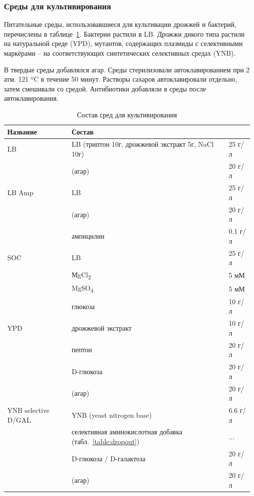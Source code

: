 \subsubsection{Среды для культивирования}
Питательные среды, использовавшиеся для культивации дрожжей и бактерий, перечислены в таблице~\ref{table:mediums}. Бактерии растили в LB. Дрожжи дикого типа растили на натуральной среде (YPD), мутантов, содержащих плазмиды с селективными маркёрами -- на соответствующих синтетических селективных средах (YNB).

В твердые среды добавлялся агар. Среды стерилизовали автоклавированием при 2 атм. 121 ºC в течение 50 минут. Растворы сахаров автоклавировали отдельно, затем смешивали со средой. Антибиотики добавляли в среды после автоклавирования. 

\begin{table}[p]
	\footnotesize
	\caption{Состав сред для культивирования}
	\label{table:mediums}
	\begin{tabular}{ p{0.3\width - \tabcolsep} p{0.55\width - 2\tabcolsep} p{0.15\width - \tabcolsep} }
	\graytable
	\toprule
	Название & Состав & \\
	\midrule
	LB & 
		LB \scriptsize (триптон 10г, дрожжевой экстракт 5г, NaCl 10г)& 25 г/л\\
		& (агар) & 20 г/л\\

	\thinrule
	LB Amp & 
		LB & 25 г/л\\
		& (агар) & 20 г/л\\
		& ампицилин & 0.1 г/л\\
	\thinrule
	SOC & 
		LB & 25 г/л \\
		&МgCl\textsubscript{2} & 5 мМ\\
		&MgSO\textsubscript{4} & 5 мМ\\
		&глюкоза& 10 г/л\\
	YPD & 
			дрожжевой экстракт & 10 г/л \\ 
			& пептон  & 20 г/л\\
			& D-глюкоза & 20 г/л \\
			& (агар) & 20 г/л \\
			
	\thinrule
	YNB selective D/GAL & 

			YNB (yeast nitrogen base) &  6.6 г/л\\
			&селективная аминокислотная добавка (табл.~\ref{table:dropout}) & ...\\
			&D-глюкоза / D-галактоза & 20 г/л \\
			&(агар) & 20 г/л \\


	\bottomrule
	\end{tabular}
\end{table}

